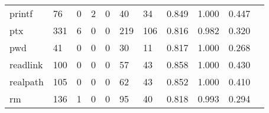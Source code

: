 \begin{longtable}{lp{1.2cm}p{1.2cm}p{1.2cm}p{1.2cm}p{1.2cm}p{1.2cm}p{1.2cm}p{1.2cm}p{1.2cm}p{1.2cm}}
printf    &                                    76 &                                                  0 &                                                  2 &                                                  0 &                                                 40 &                                                 34 &                                              0.849 &                                              1.000 &                                              0.447 \\
ptx       &                                   331 &                                                  6 &                                                  0 &                                                  0 &                                                219 &                                                106 &                                              0.816 &                                              0.982 &                                              0.320 \\
pwd       &                                    41 &                                                  0 &                                                  0 &                                                  0 &                                                 30 &                                                 11 &                                              0.817 &                                              1.000 &                                              0.268 \\
readlink  &                                   100 &                                                  0 &                                                  0 &                                                  0 &                                                 57 &                                                 43 &                                              0.858 &                                              1.000 &                                              0.430 \\
realpath  &                                   105 &                                                  0 &                                                  0 &                                                  0 &                                                 62 &                                                 43 &                                              0.852 &                                              1.000 &                                              0.410 \\
rm        &                                   136 &                                                  1 &                                                  0 &                                                  0 &                                                 95 &                                                 40 &                                              0.818 &                                              0.993 &                                              0.294 \\

\end{longtable}

